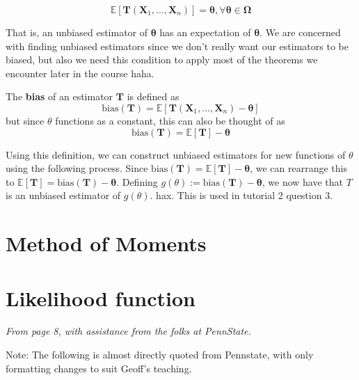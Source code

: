 \begin{equation}\label{eq:unbiased cond}
    \mathbb{E}[\bm{T}(\bm{X}_1, ..., \bm{X}_n)] = \bm{\theta}, \forall \bm{\theta}\in\bm{\Omega}
\end{equation}

That is, an unbiased estimator of \(\bm{\theta}\) has an expectation of \(\bm{\theta}\). 
We are concerned with finding unbiased estimators since we don't really want our estimators to be biased, but also we
need this condition to apply most of the theorems we encounter later in the course haha.

\begin{definition}\label{defn:bias}
    The \textbf{bias} of an estimator \(\bm{T}\) is defined as
    \begin{equation}\label{eq:bias}
        \text{bias}(\bm{T}) = \mathbb{E}[\bm{T}(\bm{X}_1, ..., \bm{X}_n) - \bm{\theta}]
    \end{equation}
    but since \(\theta\) functions as a constant, this can also be thought of as 
    \[\text{bias}(\bm{T}) = \mathbb{E}[\bm{T}] - \bm{\theta}\]
\end{definition}

Using this definition, we can construct unbiased estimators for new functions of \(\theta\) using the following process. 
Since \(\text{bias}(\bm{T}) = \mathbb{E}[\bm{T}] - \bm{\theta}\), we can rearrange this to \(\mathbb{E}[\bm{T}] = \text{bias}(\bm{T}) - \bm{\theta}\). 
Defining \(g(\theta):= \text{bias}(\bm{T}) - \bm{\theta}\), we now have that \(T\) is an unbiased estimator of \(g(\theta)\). 
hax. This is used in tutorial 2 question 3.

\section{Method of Moments}\label{sec:method of moments}






\section{Likelihood function}\label{sec:likelihood func}

\textit{From page 8, with assistance from the folks at PennState.\autocite{penn415}}

Note: The following is almost directly quoted from Pennstate, with only formatting changes to suit Geoff's teaching.

\medskip

